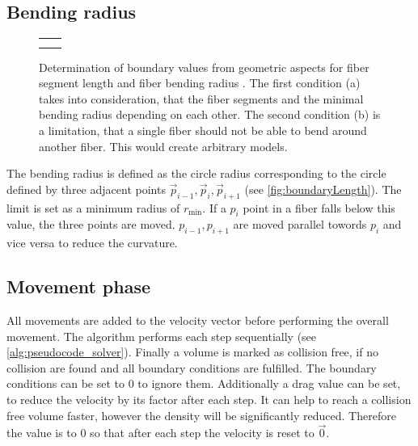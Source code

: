 \subsection{Bending radius}
%
\begin{figure}[!t]
    \centering
    \setlength{\tikzheight}{.42\textwidth}
    \setlength{\tabcolsep}{0pt}
    \begin{tabular}{C{0.5\textwidth}C{0.5\textwidth}}
     &
     \\
     &
    \end{tabular}
	\caption{Determination of boundary values from geometric aspects for fiber segment length \segLength{} and fiber bending radius \segRadius{}. The first condition (a) takes into consideration, that the fiber segments and the minimal bending radius depending on each other. The second condition (b) is a limitation, that a single fiber should not be able to bend around another fiber. This would create arbitrary models.}
	\label{fig:modelCircle}
\end{figure}
%
The bending radius is defined as the circle radius corresponding to the circle defined by three adjacent points $\vec{p}_{i-1}, \vec{p}_{i}, \vec{p}_{i+1}$ (see \cref{fig:boundaryLength}).
The limit is set as a minimum radius of $r_{\min}$.
If a $p_{i}$ point in a fiber falls below this value, the three points are moved.
$p_{i-1},p_{i+1}$ are moved parallel towords $p_{i}$ and vice versa to reduce the curvature.
%
% 
% 
\subsection{Movement phase}
% 
All movements are added to the velocity vector before performing the overall movement.
The algorithm performs each step sequentially (see \cref{alg:pseudocode_solver}).
Finally a volume is marked as collision free, if no collision are found and all boundary conditions are fulfilled.
The boundary conditions can be set to $0$ to ignore them.
Additionally a drag value can be set, to reduce the velocity by its factor after each step.
It can help to reach a collision free volume faster, however the density will be significantly reduced.
Therefore the value is to $0$ so that after each step the velocity is reset to $\vec{0}$.
% 
% 
% 
